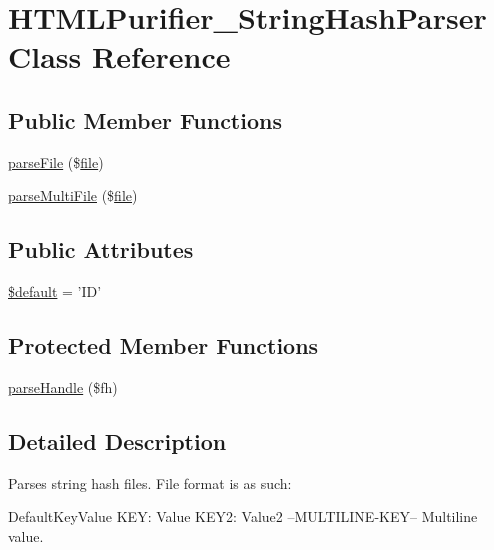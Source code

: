 \hypertarget{classHTMLPurifier__StringHashParser}{\section{H\+T\+M\+L\+Purifier\+\_\+\+String\+Hash\+Parser Class Reference}
\label{classHTMLPurifier__StringHashParser}
}
\subsection*{Public Member Functions}
\begin{DoxyCompactItemize}
\item 
\hyperlink{classHTMLPurifier__StringHashParser_a99caa0029a1455478239284ef84a3c63}{parse\+File} (\$\hyperlink{classfile}{file})
\item 
\hyperlink{classHTMLPurifier__StringHashParser_a26a65554161c1775dc71fc59a30a4478}{parse\+Multi\+File} (\$\hyperlink{classfile}{file})
\end{DoxyCompactItemize}
\subsection*{Public Attributes}
\begin{DoxyCompactItemize}
\item 
\hyperlink{classHTMLPurifier__StringHashParser_a166b076f78ab5974134a32a41b11343c}{\$default} = 'I\+D'
\end{DoxyCompactItemize}
\subsection*{Protected Member Functions}
\begin{DoxyCompactItemize}
\item 
\hyperlink{classHTMLPurifier__StringHashParser_a1e66328aa2f6f981b2ca95d5a3c0eb47}{parse\+Handle} (\$fh)
\end{DoxyCompactItemize}


\subsection{Detailed Description}
Parses string hash files. File format is as such\+: \begin{DoxyVerb} DefaultKeyValue
 KEY: Value
 KEY2: Value2
 --MULTILINE-KEY--
 Multiline
 value.
\end{DoxyVerb}


